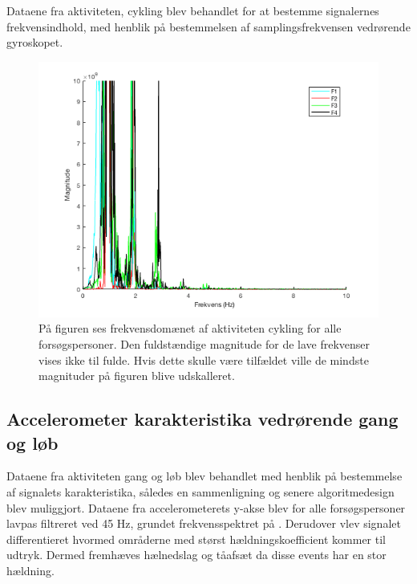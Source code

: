 Dataene fra aktiviteten, cykling blev behandlet for at bestemme signalernes frekvensindhold, med henblik på bestemmelsen af samplingsfrekvensen vedrørende gyroskopet.
\begin{figure}[H]
	\centering
	\includegraphics[scale=0.68]{figures/qBilag/cykling_frekvens}
	\caption{På figuren ses frekvensdomænet af aktiviteten cykling for alle forsøgspersoner. Den fuldstændige magnitude for de lave frekvenser vises ikke til fulde. Hvis dette skulle være tilfældet ville de mindste magnituder på figuren blive udskalleret.}
	\label{fig:Ap_cyklingfrekvens}
\end{figure}

\subsection{Accelerometer karakteristika vedrørende gang og løb}
Dataene fra aktiviteten gang og løb blev behandlet med henblik på bestemmelse af signalets karakteristika, således en sammenligning og senere algoritmedesign blev muliggjort. Dataene fra accelerometerets y-akse blev for alle forsøgspersoner lavpas filtreret ved 45 Hz, grundet frekvensspektret på . Derudover vlev signalet differentieret hvormed områderne med størst hældningskoefficient kommer til udtryk. Dermed fremhæves hælnedslag og tåafsæt da disse events har en stor hældning.


